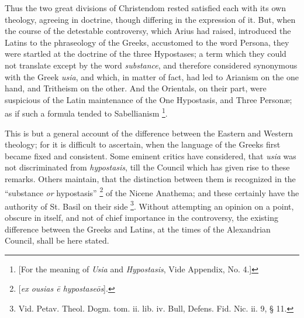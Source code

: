 Thus the two great divisions of Christendom rested satisfied each
with its own theology, agreeing in doctrine, though differing in the
expression of it. But, when the course of the detestable controversy,
which Arius had raised, introduced the Latins to the phraseology of
the Greeks, accustomed to the word Persona, they were startled at the
doctrine of the three Hypostases; a term which they could not
translate except by the word \emph{substance}, and therefore
considered synonymous with the Greek \emph{usia}, and which, in matter
of fact, had led to Arianism on the one hand, and Tritheism on the
other. And the Orientals, on their part, were suspicious of the Latin
maintenance of the One Hypostasis, and Three Personæ; as if such a
formula tended to Sabellianism \footnote{[For the meaning of \emph{Usia} and \emph{Hypostasis},
Vide Appendix, No. 4.]}.

This is but a general account of the difference between the Eastern
and Western theology; for it is difficult to ascertain, when the
language of the Greeks first became fixed and consistent. Some eminent
critics have considered, that \emph{usia} was not discriminated from \emph{hypostasis},
till the Council which has given rise to these remarks. Others
maintain, that the distinction between them is recognized in the
``substance \emph{or} hypostasis'' \footnote{[\emph{ex ousias \={e} hypostase\={o}s}].} of the Nicene Anathema; and these certainly have the authority
of St. Basil on their side \footnote{Vid. Petav. Theol. Dogm. tom. ii. lib. iv.
Bull, Defens. Fid. Nic. ii. 9, § 11.}.
Without attempting an opinion on a point, obscure in itself, and not
of chief importance in the controversy, the existing difference
between the Greeks and Latins, at the times of the Alexandrian
Council, shall be here stated.

